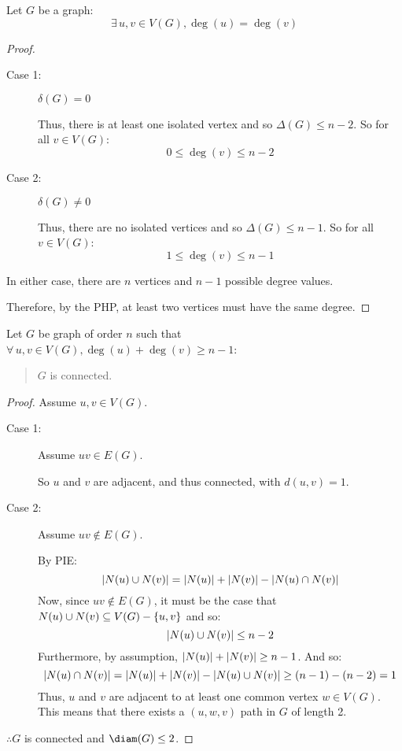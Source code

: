 \documentclass[letterpaper,12pt,fleqn]{article}
\renewcommand{\d}{\delta}
\newcommand{\D}{\Delta}
\begin{document}
\begin{theorem}
  Let \(G\) be a graph:
  \[\exists\,u,v\in V(G),\deg(u)=\deg(v)\]
\end{theorem}

\begin{proof}
  \begin{description}
  \item[]
  \item[Case 1:] \(\d(G)=0\)

    Thus, there is at least one isolated vertex and so \(\D(G)\le n-2\).  So for all \(v\in V(G)\):
    \[0\le\deg(v)\le n-2\]

  \item[Case 2:] \(\d(G)\ne0\)

    Thus, there are no isolated vertices and so \(\D(G)\le n-1\).  So for all \(v\in V(G)\):
    \[1\le\deg(v)\le n-1\]
  \end{description}

  In either case, there are \(n\) vertices and \(n-1\) possible degree values.

  Therefore, by the PHP, at least two vertices must have the same degree.
\end{proof}

\begin{theorem}
  Let \(G\) be graph of order \(n\) such that \(\forall\,u,v\in V(G),\deg(u)+\deg(v)\ge n-1\):
  \begin{quote}
    \(G\) is connected.
  \end{quote}
\end{theorem}

\begin{proof}
  Assume \(u,v\in V(G)\).

  \begin{description}
  \item[Case 1:] Assume \(uv\in E(G)\).

    So \(u\) and \(v\) are adjacent, and thus connected, with \(d(u,v)=1\).

  \item[Case 2:] Assume \(uv\notin E(G)\).

    By PIE:
    \[\lvert N(u)\cup N(v)\rvert=\lvert N(u)\rvert+\lvert N(v)\rvert-\lvert N(u)\cap N(v)\rvert\]
    Now, since \(uv\notin E(G)\), it must be the case that \(N(u)\cup N(v)\subseteq V(G)-\{u,v\}\) and so:
    \[\lvert N(u)\cup N(v)\rvert\le n-2\]
    Furthermore, by assumption, \(\lvert N(u)\rvert+\lvert N(v)\rvert\ge n-1\).  And so:
    \[\lvert N(u)\cap N(v)\rvert=\lvert N(u)\rvert+\lvert N(v)\rvert-\lvert N(u)\cup N(v)\rvert\ge(n-1)-(n-2)=1\]
    Thus, \(u\) and \(v\) are adjacent to at least one common vertex \(w\in V(G)\).  This means that there exists
    a \((u,w,v)\) path in \(G\) of length 2.
  \end{description}

  \(\therefore G\) is connected and \(\diam(G)\le2\).
\end{proof}
\end{document}
